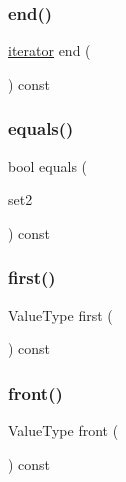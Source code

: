 \mbox{\label{classSet_a68b688a51bd0cf6fb5bc2cba292209a8}} 
\subsubsection{\texorpdfstring{end()}{end()}}
{\footnotesize\ttfamily \mbox{\hyperlink{classSet_1_1iterator}{iterator}} end (\begin{DoxyParamCaption}{ }\end{DoxyParamCaption}) const\hspace{0.3cm}{\ttfamily [inline]}}

\mbox{\label{classSet_a1d3d3137e38441eab9f56a979201c385}} 
\subsubsection{\texorpdfstring{equals()}{equals()}}
{\footnotesize\ttfamily bool equals (\begin{DoxyParamCaption}\item[{const \mbox{\hyperlink{classSet}{Set}}$<$ Value\+Type $>$ \&}]{set2 }\end{DoxyParamCaption}) const}

\mbox{\label{classSet_aaeecd3ae022dd6b19df936718f4ab831}} 
\subsubsection{\texorpdfstring{first()}{first()}}
{\footnotesize\ttfamily Value\+Type first (\begin{DoxyParamCaption}{ }\end{DoxyParamCaption}) const}

\mbox{\label{classSet_abaa174a9d74f7e7e38d4944fa43b5a33}} 
\subsubsection{\texorpdfstring{front()}{front()}}
{\footnotesize\ttfamily Value\+Type front (\begin{DoxyParamCaption}{ }\end{DoxyParamCaption}) const}

